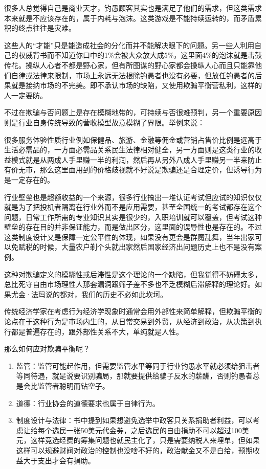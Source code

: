 \documentclass[]{book}
\begin{document}
很多人总觉得自己是商业天才，钓愚顾客其实也是满足了他们的需求，但这类需求本来就是不应该存在的，属于内耗与泡沫。这类游戏是不能持续运转的，而矛盾累积的终点往往是灾难。

这些人的``才能''只是能造成社会的分化而并不能解决眼下的问题。另一些人利用自己的权威背书而不知道你口中的1\%会被大众放大成5\%，这里面4\%的泡沫就是击鼓传花。操纵人心者不都是野心家，但有所图谋的野心家都会操纵人心而且只能靠他们自律或法律来限制，市场上永远无法根除钓愚者也没有必要，但放任钓愚者的后果就是接纳市场的不完美。即不承认市场的缺陷，又使用欺骗平衡营私利，这样的人一定要防。

不过在欺骗与否问题上是存在模糊地带的，可持续与否很难预判，另一个重要原因则是行业自身传统导致的营收模型故意模糊了界限。举例来说：

很多服务体验性质行业例如保健品、旅游、金融等佣金或营销占售价比例是远高于生活必需品的，一方面必需品关系民生法律相对健全，另一方面则是这类行业的收益模式就是从两成人手里赚一半的利润，然后再从另外八成人手里赚另一半来防止有价无市，那么这里面用到的价格歧视就不好说是欺骗还是合理定价，但诱导行为是一定存在的。

行业壁垒也是超额收益的一个来源，很多行业搞出一堆认证考试但应试的知识仅仅就是为了把投机者隔离在行业外而不是应用需要，甚至全国统一的考试都存在这个问题，日常工作所需的专业知识其实是很少的，入职培训就可以覆盖，但考试这种壁垒的存在目的并非保证能力，而是做出区分，这里面的误导性也是存在的。不过这类制度设计又是保障一定公平性的体现，如果没有更会是群魔乱舞，当年出家可以免赋税的时候，大量农户剃个头就出家然后国家经济出问题历史上也不是没有案例。

这种对欺骗定义的模糊性或后滞性是这个理论的一个缺陷，但我觉得不妨碍太多，总比死守自由市场理性人那套漏洞跟筛子差不多也不乏模糊后滞解释的理论好。如果尤金·法玛说的都对，我们的历史不必如此坎坷。

传统经济学家在考虑行为经济学现象时通常会用外部性来简单解释，但欺骗平衡的论点在于这种行为是市场内生的，从日常交易到外贸，从经济到政治，从决策到执行都是普遍存在的，跟外部性关系不大，单纯就是人性。

那么如何应对欺骗平衡呢？

\begin{enumerate}
\def\labelenumi{\arabic{enumi}.}
\item
  监管：监管可能起作用，但需要监管水平等同于行业钓愚水平就必须给狙击者等同待遇，就是说要识别骗局，那就要提供给骗子反水的薪酬，否则钓愚者总是会比监管者聪明而钻空子。
\item
  道德：行业协会的道德要求也属于自律行为。
\item
  制度设计与法律：书中提到如果想避免选举中政客只关系捐助者利益，可以考虑让给每个选民一张50美元代金券，之后选民的自由捐助不可以超过100美元，这样竞选经费的筹集问题也就民主化了，只是需要纳税人来埋单，但如果这样可以规避财阀对政治的控制也没啥不好的，政治献金又不是白给，预期收益大于支出才会有捐助。
\end{enumerate}
\end{document}
